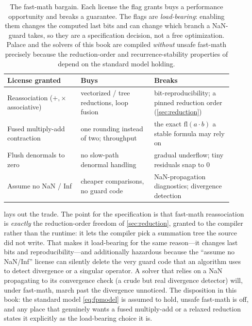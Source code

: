 \begin{table}[t]
\centering
\caption[What fast-math buys and breaks]{The fast-math bargain. Each license the
flag grants buys a performance opportunity and breaks a guarantee. The flags are
\emph{load-bearing}: enabling them changes the computed last bits and can change
which branch a NaN-guard takes, so they are a specification decision, not a free
optimization. Palace and the solvers of this book are compiled \emph{without}
unsafe fast-math precisely because the reduction-order and recurrence-stability
properties of  depend on the standard model
holding.}
\label{tab:fastmath}
\small
\setlength{\tabcolsep}{6pt}
\renewcommand{\arraystretch}{1.25}
\begin{tabular}{@{}p{0.30\linewidth}p{0.30\linewidth}p{0.32\linewidth}@{}}
\toprule
License granted & Buys & Breaks \\
\midrule
Reassociation ($+,\times$ associative) & vectorized / tree reductions, loop
  fusion & bit-reproducibility; a pinned reduction order (\cref{sec:reduction}) \\
Fused multiply-add contraction & one rounding instead of two; throughput &
  the exact $\mathrm{fl}(a\cdot b)$ a stable formula may rely on \\
Flush denormals to zero & no slow-path denormal handling & gradual underflow; tiny
  residuals snap to $0$ \\
Assume no NaN / Inf & cheaper comparisons, no guard code & NaN-propagation
  diagnostics; divergence detection \\
\bottomrule
\end{tabular}
\end{table}

 lays out the trade. The point for the specification is that
fast-math reassociation is \emph{exactly} the reduction-order freedom of
\cref{sec:reduction}, granted to the compiler rather than the runtime: it lets the
compiler pick a summation tree the source did not write. That makes it load-bearing
for the same reason---it changes last bits and reproducibility---and additionally
hazardous because the ``assume no NaN/Inf'' license can silently delete the very
guard code that an algorithm uses to detect divergence or a singular operator. A
solver that relies on a NaN propagating to its convergence check (a crude but real
divergence detector) will, under fast-math, march past the divergence unnoticed.
The disposition in this book: the standard model \eqref{eq:fpmodel} is assumed to
hold, unsafe fast-math is off, and any place that genuinely wants a fused
multiply-add or a relaxed reduction states it explicitly as the load-bearing choice
it is.

